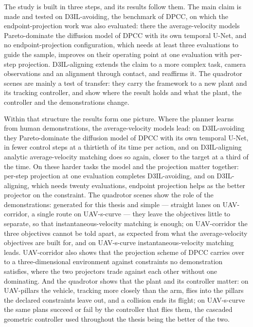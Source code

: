 The study is built in three steps, and its results follow them. The main claim is made and tested on
D3IL-avoiding, the benchmark of \ac{DPCC}, on which the endpoint-projection work was also evaluated: there the
average-velocity models Pareto-dominate the diffusion model of \ac{DPCC} with its own temporal U-Net, and no
endpoint-projection configuration, which needs at least three evaluations to guide the sample, improves on their
operating point at one evaluation with per-step projection. D3IL-aligning extends the claim to a more complex
task, camera observations and an alignment through contact, and reaffirms it. The quadrotor scenes are mainly a
test of transfer: they carry the framework to a new plant and its tracking controller, and show where the result
holds and what the plant, the controller and the demonstrations change.

Within that structure the results form one picture. Where the planner learns from human
demonstrations, the average-velocity models lead: on D3IL-avoiding they Pareto-dominate the diffusion model of
\ac{DPCC} with its own temporal U-Net, in fewer control steps at a thirtieth of its time per action, and on
D3IL-aligning analytic average-velocity matching does so again, closer to the target at a third of the time.
On these harder tasks the model and the projection matter together: per-step projection at one evaluation
completes D3IL-avoiding, and on D3IL-aligning, which needs twenty evaluations, endpoint projection helps as the
better projector on the constraint. The quadrotor scenes show the role of the demonstrations: generated for
this thesis and simple --- straight lanes on UAV-corridor, a single route on UAV-s-curve --- they leave the
objectives little to separate, so that instantaneous-velocity matching is enough; on UAV-corridor the three
objectives cannot be told apart, as expected from what the average-velocity objectives are built for, and on
UAV-s-curve instantaneous-velocity matching leads. UAV-corridor also shows that the projection scheme of
\ac{DPCC} carries over to a three-dimensional environment against constraints no demonstration satisfies,
where the two projectors trade against each other without one dominating. And the quadrotor shows that the
plant and its controller matter: on UAV-pillars the vehicle, tracking more closely than the arm, flies into
the pillars the declared constraints leave out, and a collision ends its flight; on UAV-s-curve the same
plans succeed or fail by the controller that flies them, the cascaded geometric controller used throughout the
thesis being the better of the two.

